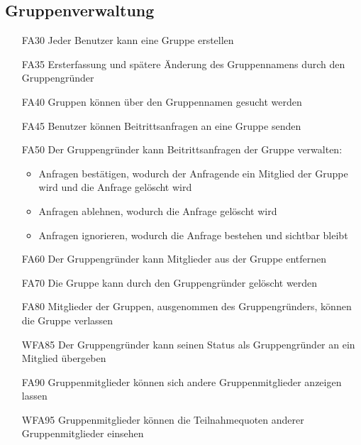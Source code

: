 \documentclass{scrartcl}
\begin{document}
		\subsection{Gruppenverwaltung}
		\begin{itemize}
			\hypertarget{FA30}{}
			\item[FA30] Jeder Benutzer kann eine Gruppe erstellen
			\hypertarget{FA35}{}
			\item[FA35] Ersterfassung und spätere Änderung des Gruppennamens durch den Gruppengründer
			\hypertarget{FA40}{}
			\item[FA40] Gruppen können über den Gruppennamen gesucht werden
			\hypertarget{FA45}{}
			\item[FA45] Benutzer können Beitrittsanfragen an eine Gruppe senden
			\hypertarget{FA50}{}
			\item[FA50] Der Gruppengründer kann Beitrittsanfragen der Gruppe verwalten:
			\begin{itemize}
				\item Anfragen bestätigen, wodurch der Anfragende ein Mitglied der Gruppe wird und die Anfrage gelöscht wird
			\end{itemize}
			\begin{itemize}
				\item Anfragen ablehnen, wodurch die Anfrage gelöscht wird
			\end{itemize}
			\begin{itemize}
				\item Anfragen ignorieren, wodurch die Anfrage bestehen und sichtbar bleibt
			\end{itemize}
			\hypertarget{FA60}{}
			\item[FA60] Der Gruppengründer kann Mitglieder aus der Gruppe entfernen
			\hypertarget{FA70}{}
			\item[FA70] Die Gruppe kann durch den Gruppengründer gelöscht werden
			\hypertarget{FA80}{}
			\item[FA80] Mitglieder der Gruppen, ausgenommen des Gruppengründers, können die Gruppe verlassen
			\hypertarget{WFA85}{}
			\item[WFA85] Der Gruppengründer kann seinen Status als Gruppengründer an ein Mitglied übergeben
			\hypertarget{FA90}{}
			\item[FA90] Gruppenmitglieder können sich andere Gruppenmitglieder anzeigen lassen
			\hypertarget{WFA95}{}
			\item[WFA95] Gruppenmitglieder können die Teilnahmequoten anderer Gruppenmitglieder einsehen
			
		\end{itemize}
		
\end{document}
